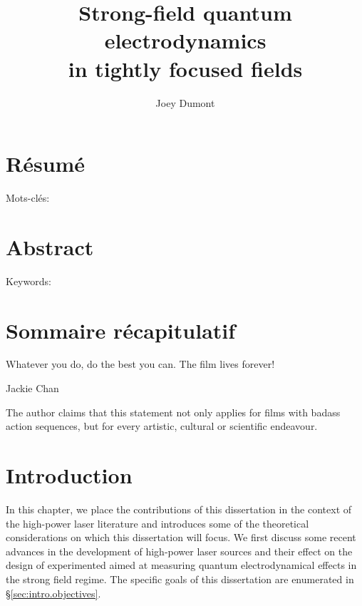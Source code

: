 \documentclass[11pt,SymmetricalJury]{inrsthesis/inrsthesis}
\title{Strong-field quantum electrodynamics \\ in tightly focused fields}
\author{Joey Dumont}
\begin{document}
\frontmatter

\maketitle

\chapter{Résumé}

Mots-clés:

\chapter{Abstract}

Keywords:

\chapter{Sommaire récapitulatif}
\cleardoublepage

\tableofcontents
\cleardoublepage

\listoftables
\cleardoublepage

\listoffigures
\cleardoublepage

\dedication{To my wife and son.}
\cleardoublepage

\epigraph{Whatever you do, do the best you can. The film lives forever!}{Jackie Chan}

\begin{flushright}
\begin{minipage}{0.35\textwidth}
The author claims that this statement not only applies for films with badass
action sequences, but for every artistic, cultural or scientific endeavour.
\end{minipage}
\end{flushright}

\cleardoublepage

\mainmatter

\chapter{Introduction}

  In this chapter, we place the contributions of this dissertation in the context
  of the high-power laser literature and introduces some of the theoretical
  considerations on which this dissertation will focus. We first discuss some recent
  advances in the development of high-power laser sources and their effect
  on the design of experimented aimed at measuring quantum electrodynamical
  effects in the strong field regime. The specific goals of this dissertation are
  enumerated in \S\ref{sec:intro.objectives}.
\end{document}
